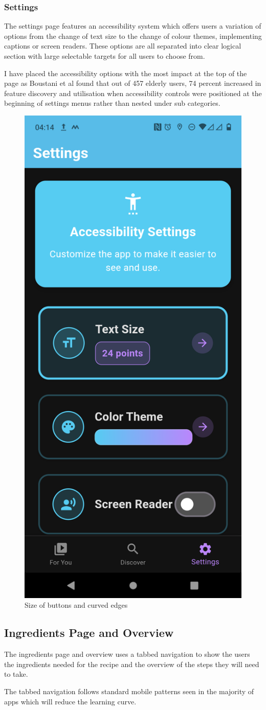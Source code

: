 \documentclass[]{project_final}
\begin{document}
\subsubsection{Settings}
The settings page features an accessibility system which offers users a variation of options from the change of text size to the change of colour themes, implementing captions or screen readers. These options are all separated into clear logical section with large selectable targets for all users to choose from.

I have placed the accessibility options with the most impact at the top of the page as Boustani et al found that out of 457 elderly users, 74 percent increased in feature discovery and utilisation when accessibility controls were positioned at the beginning of settings menus rather than nested under sub categories.

\begin{figure}[ht!]
  \centering
  \includegraphics[height=0.5\textwidth]{mraSetting.png}
  \caption{Size of buttons and curved edges}
  \label{fig:1}
\end{figure}

\subsection{Ingredients Page and Overview}

The ingredients page and overview uses a tabbed navigation to show the users the ingredients needed for the recipe and the overview of the steps they will need to take.

The tabbed navigation follows standard mobile patterns seen in the majority of apps which will reduce the learning curve.
\end{document}
